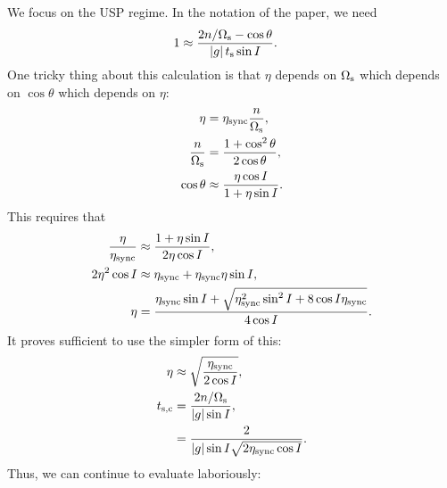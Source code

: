 \documentclass[11pt,
        usenames, %
        dvipsnames %
    ]{article}
\newcommand*{\abs}[1]{\left|#1\right|}
\begin{document}
We focus on the USP regime. In the notation of the paper, we need
\begin{align}
    1
        &\approx \frac{2n / \Omega_{\rm s} - \cos \theta
            }{\abs{g}t_{\rm s}\sin I}.
\end{align}
One tricky thing about this calculation is that $\eta$ depends on $\Omega_{\rm
s}$ which depends on $\cos \theta$ which depends on $\eta$:
\begin{align}
    \eta &= \eta_{\rm sync} \frac{n}{\Omega_{\rm s}},\\
    \frac{n}{\Omega_{\rm s}} &= \frac{1 + \cos^2\theta}{2 \cos \theta},\\
    \cos \theta &\approx \frac{\eta \cos I}{1 + \eta \sin I}.
\end{align}
This requires that
\begin{align}
    \frac{\eta}{\eta_{\rm sync}} &\approx \frac{1 + \eta \sin I
        }{2\eta \cos I},\\
    2\eta^2 \cos I &\approx \eta_{\rm sync} + \eta_{\rm sync}\eta \sin I,\\
    \eta &= \frac{\eta_{\rm sync}\sin I + \sqrt{
        \eta_{\rm sync}^2 \sin^2 I + 8\cos I \eta_{\rm sync}}}{
            4 \cos I}.
\end{align}
It proves sufficient to use the simpler form of this:
\begin{align}
    \eta &\approx \sqrt{\frac{\eta_{\rm sync}}{2\cos I}},\\
    t_{\rm s, c} &= \frac{2n / \Omega_{\rm s}}{\abs{g}\sin I},\\
        &= \frac{2}{\abs{g}\sin I\sqrt{2\eta_{\rm sync} \cos I}}.
\end{align}
Thus, we can continue to evaluate laboriously:
\end{document}
